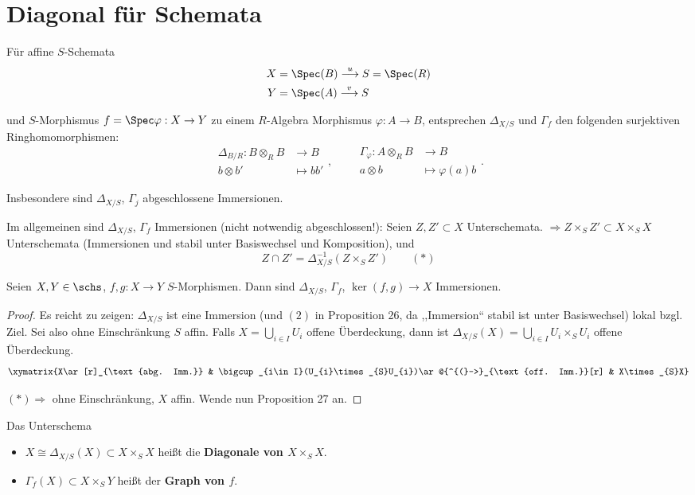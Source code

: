 \section{Diagonal für Schemata}
\begin{prop}[27]
  Für affine $S$-Schemata
  \begin{align*}
    X & =\Spec(B)\overset{u}{\longrightarrow}S=\Spec(R)\\
    Y & =\Spec(A)\overset{v}{\longrightarrow}S
  \end{align*}

  und $S$-Morphismus $f=\Spec\varphi:X\rightarrow Y$ zu einem $R$-Algebra
  Morphismus $\varphi:A\rightarrow B$, entsprechen $\Delta_{X/S}$
  und $\Gamma_{f}$ den folgenden surjektiven Ringhomomorphismen:
  \[
    \begin{array}{rl}
      \Delta_{B/R}:B\otimes_{R}B & \longrightarrow B\\
      b\otimes b' & \longmapsto bb'
    \end{array},\qquad
    \begin{array}{rl}
      \Gamma_{\varphi}:A\otimes_{R}B & \longrightarrow B\\
      a\otimes b & \longmapsto\varphi(a)b
    \end{array}.
  \]
  
  Insbesondere sind $\Delta_{X/S}$, $\Gamma_{j}$ abgeschlossene Immersionen.
\end{prop}

Im allgemeinen sind $\Delta_{X/S}$, $\Gamma_{f}$ Immersionen (nicht
notwendig abgeschlossen!): Seien $Z,Z'\subset X$ Unterschemata. $\Longrightarrow Z\times_{S}Z'\subset X\times_{S}X$
Unterschemata (Immersionen und stabil unter Basiswechsel und Komposition),
und
\[
  Z\cap Z'=\Delta_{X/S}^{-1}(Z\times_{S}Z')\qquad(*)
\]

\begin{prop}
  Seien $X,Y\in\schs$, $f,g:X\rightarrow Y$ $S$-Morphismen. Dann
  sind $\Delta_{X/S}$, $\Gamma_{f}$, $\ker(f,g)\rightarrow X$ Immersionen.
\end{prop}

\begin{proof}
  Es reicht zu zeigen: $\Delta_{X/S}$ ist eine Immersion (und $(2)$
  in Proposition 26, da ,,Immersion`` stabil ist unter Basiswechsel)
  lokal bzgl. Ziel. Sei also ohne Einschränkung $S$ affin. Falls $X=\bigcup_{i\in I}U_{i}$
  offene Überdeckung, dann ist $\Delta_{X/S}(X)=\bigcup_{i\in I}U_{i}\times_{S}U_{i}$
  offene Überdeckung. 
  \[
    \xymatrix{X\ar[r]_{\text{abg. Imm.}} & \bigcup_{i\in I}(U_{i}\times_{S}U_{i})\ar@{^{(}->}_{\text{off. Imm.}}[r] & X\times_{S}X}
  \]
  
  $(*)\Longrightarrow$ ohne Einschränkung, $X$ affin. Wende nun Proposition
  27 an.
\end{proof}
Das Unterschema
\begin{itemize}
\item $X\cong\Delta_{X/S}(X)\subset X\times_{S}X$ heißt die \textbf{Diagonale
    von $X\times_{S}X$}.
\item $\Gamma_{f}(X)\subset X\times_{S}Y$ heißt der \textbf{Graph von $f$}.
\end{itemize}

